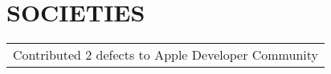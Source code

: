 \documentclass[a4paper]{lyu-resume} %
\begin{document}
\begin{minipage}[t]{0.66\textwidth}

\sectionspace %

\section{SOCIETIES} 

\begin{tabular}{l}
\textbullet{} Contributed 2 defects to Apple Developer Community\\
\end{tabular}

\sectionspace %
\end{minipage} %
\end{document}
